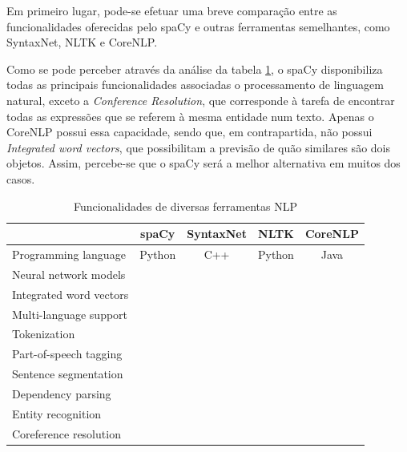 \documentclass[12pt]{article}
\newcommand{\cmark}{\color[rgb]{0,0.7,0}\ding{51}}%
\newcommand{\xmark}{\color[rgb]{0.7,0,0}\ding{55}}%
\begin{document}
Em primeiro lugar, pode-se efetuar uma breve comparação entre as funcionalidades oferecidas pelo spaCy e outras ferramentas semelhantes, como SyntaxNet, NLTK e CoreNLP.

Como se pode perceber através da análise da tabela \ref{table:campare_features}, o spaCy disponibiliza todas as principais funcionalidades associadas o processamento de linguagem natural, exceto a \textit{Conference Resolution}, que corresponde à tarefa de encontrar todas as expressões que se referem à mesma entidade num texto. Apenas o CoreNLP possui essa capacidade, sendo que, em contrapartida, não possui \textit{Integrated word vectors}, que possibilitam a previsão de quão similares são dois objetos. Assim, percebe-se que o spaCy será a melhor alternativa em muitos dos casos.

\begin{table}[!ht]
	\centering
	\renewcommand{\arraystretch}{1.3}
	\begin{tabular}{l|c|c|c|c|}
		\cline{2-5}
	& \cellcolor[HTML]{C0C0C0}\textbf{spaCy} & \cellcolor[HTML]{C0C0C0}\textbf{SyntaxNet} & \cellcolor[HTML]{C0C0C0}\textbf{NLTK} & \cellcolor[HTML]{C0C0C0}\textbf{CoreNLP} \\ \hline
	\multicolumn{1}{|l|}{\cellcolor[HTML]{C0C0C0}Programming language}
	& Python   & C++      & Python   & Java     \\ \hline
	\multicolumn{1}{|l|}{\cellcolor[HTML]{C0C0C0}Neural network models}
	&  \cmark  &  \cmark  &  \xmark  &  \cmark  \\ \hline
	\multicolumn{1}{|l|}{\cellcolor[HTML]{C0C0C0}Integrated word vectors}
	&  \cmark  &  \xmark  &  \xmark  &  \xmark  \\ \hline
	\multicolumn{1}{|l|}{\cellcolor[HTML]{C0C0C0}Multi-language support}
	&  \cmark  &  \cmark  &  \cmark  &  \cmark  \\ \hline
	\multicolumn{1}{|l|}{\cellcolor[HTML]{C0C0C0}Tokenization}
	&  \cmark  &  \cmark  &  \cmark  &  \cmark  \\ \hline
	\multicolumn{1}{|l|}{\cellcolor[HTML]{C0C0C0}Part-of-speech tagging}
	&  \cmark  &  \cmark  &  \cmark  &  \cmark  \\ \hline
	\multicolumn{1}{|l|}{\cellcolor[HTML]{C0C0C0}Sentence segmentation}
	&  \cmark  &  \cmark  &  \cmark  &  \cmark  \\ \hline
	\multicolumn{1}{|l|}{\cellcolor[HTML]{C0C0C0}Dependency parsing}
	&  \cmark  &  \cmark  &  \xmark  &  \cmark  \\ \hline
	\multicolumn{1}{|l|}{\cellcolor[HTML]{C0C0C0}Entity recognition}
	&  \cmark  &  \xmark  &  \cmark  &  \cmark  \\ \hline
	\multicolumn{1}{|l|}{\cellcolor[HTML]{C0C0C0}Coreference resolution}
	&  \xmark  &  \xmark  &  \xmark  &  \cmark  \\ \hline
	\end{tabular}
	\caption{Funcionalidades de diversas ferramentas NLP}
	\label{table:campare_features}
\end{table}
\end{document}
